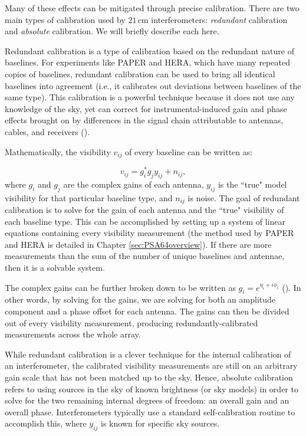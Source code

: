 Many of these effects can be mitigated through precise calibration. There are two main types of calibration used by $21$\,cm interferometers: \textit{redundant} calibration and \textit{absolute} calibration. We will briefly describe each here.

Redundant calibration is a type of calibration based on the redundant nature of baselines. For experiments like PAPER and HERA, which have many repeated copies of baselines, redundant calibration can be used to bring all identical baselines into agreement (i.e., it calibrates out deviations between baselines of the same type). This calibration is a powerful technique because it does not use any knowledge of the sky, yet can correct for instrumental-induced gain and phase effects brought on by differences in the signal chain attributable to antennas, cables, and receivers (\citealt{liu_et_al2010}).

Mathematically, the visibility $v_{ij}$ of every baseline can be written as:

\begin{equation}
v_{ij} = g_{i}^{\ast}g_{j}y_{ij} + n_{ij},
\end{equation}
where $g_{i}$ and $g_{j}$ are the complex gains of each antenna, $y_{ij}$ is the ``true" model visibility for that particular baseline type, and $n_{ij}$ is noise. The goal of redundant calibration is to solve for the gain of each antenna and the ``true" visibility of each baseline type. This can be accomplished by setting up a system of linear equations containing every visibility measurement (the method used by PAPER and HERA is detailed in Chapter \ref{sec:PSA64overview}). If there are more measurements than the sum of the number of unique baselines and antennae, then it is a solvable system. 

The complex gains can be further broken down to be written as $g_{i} = e^{\eta_{i} + i\phi_{i}}$ (\citealt{liu_et_al2010}). In other words, by solving for the gains, we are solving for both an amplitude component and a phase offset for each antenna. The gains can then be divided out of every visibility measurement, producing redundantly-calibrated measurements across the whole array.

While redundant calibration is a clever technique for the internal calibration of an interferometer, the calibrated visibility measurements are still on an arbitrary gain scale that has not been matched up to the sky. Hence, absolute calibration refers to using sources in the sky of known brightness (or sky models) in order to solve for the two remaining internal degrees of freedom: an overall gain and an overall phase. Interferometers typically use a standard self-calibration routine to accomplish this, where $y_{ij}$ is known for specific sky sources.

